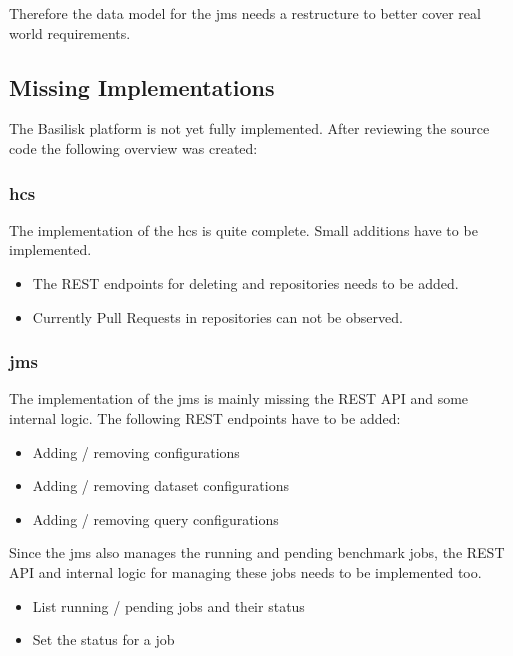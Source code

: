 Therefore the data model for the \ac{jms} needs a restructure to better cover real world requirements.


\subsection{Missing Implementations}
\label{sec:review_missing_impl}
The Basilisk platform is not yet fully implemented.
After reviewing the source code the following overview was created:

\subsubsection{\acl{hcs}}
The implementation of the \acl{hcs} is quite complete.
Small additions have to be implemented.

\begin{itemize}
	\item The REST endpoints for deleting \gh{} and \dockh{} repositories needs to be added.
	
	\item Currently Pull Requests in \gh{} repositories can not be observed.
\end{itemize}


\subsubsection{\acl{jms}}
The implementation of the \acl{jms} is mainly missing the REST API and some internal logic.
The following REST endpoints have to be added:

\begin{itemize}
	\item Adding / removing \ts{} configurations
	
	\item Adding / removing dataset configurations
	
	\item Adding / removing query configurations
\end{itemize}

Since the \ac{jms} also manages the running and pending benchmark jobs, the REST API and internal logic for managing these jobs needs to be implemented too.

\begin{itemize}
	\item List running / pending jobs and their status
	
	\item Set the status for a job
\end{itemize}



